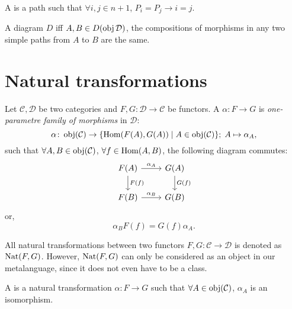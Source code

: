 \documentclass[openany, a5paper]{book}
\begin{document}
A  is a path such that $\forall i, j \in n + 1$, $P_i = P_j \to i = j$.

A diagram $D$  iff $A, B \in D(\operatorname{obj} \mathcal D)$, the compositions of morphisms in any two simple paths from $A$ to $B$ are the same.

\section{Natural transformations}
\begin{definition}
	Let $\mathcal C, \mathcal D$ be two categories and $F, G \colon \mathcal D \to \mathcal C$ be functors.
	A  $\alpha \colon F \to G$ is \emph{one-parametre family of morphisms} in $\mathcal D$:
	\begin{equation}
		\alpha \colon \operatorname{obj}(\mathcal C) \to \{\operatorname{Hom}(F(A), G(A))\mid A \in \operatorname{obj} (\mathcal C)\};
		\;
		A \mapsto \alpha_A,
	\end{equation}
	such that $\forall A, B \in \operatorname{obj}(\mathcal C)$, $\forall f \in \operatorname{Hom}(A, B)$, the following diagram commutes:
	\begin{equation}
		\begin{tikzcd}
			F(A) \arrow[d, "F(f)"] \arrow[r, "\alpha_A"] & G(A) \arrow[d, "G(f)"] \\
			F(B) \arrow[r, "\alpha_B"]                   & G(B)                  
		\end{tikzcd}
	\end{equation}
	or,
	\begin{equation}
		\alpha_B  F(f) = G(f) \alpha_A.
	\end{equation}
\end{definition}

All natural transformations between two functors $F, G \colon \mathcal C \to \mathcal D$ is denoted as $\operatorname{Nat}(F, G)$. 
However, $\operatorname{Nat}(F, G)$ can only be considered as an object in our metalanguage, since it does not even have to be a class.

A  is a natural transformation $\alpha \colon F \to G$ such that $\forall A \in \operatorname{obj}(\mathcal C)$, $\alpha_A$ is an isomorphism.
\end{document}
